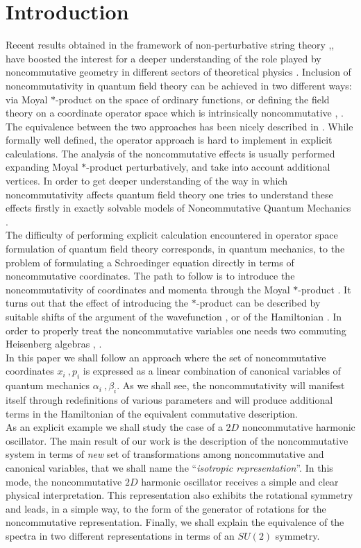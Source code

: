 \documentclass[a4paper,aps,prd,preprint]{revtex4}
\begin{document}
\section{Introduction}
Recent results obtained in the framework of non-perturbative string theory
\cite{witten},\cite{sw}, have boosted the interest for a deeper 
understanding of the role played by noncommutative geometry in different 
sectors of theoretical physics \cite{schw}. 
Inclusion of noncommutativity in quantum field theory 
can be achieved in two different ways: via Moyal $\ast$-product on the space of
ordinary functions, or defining the field
theory on a coordinate operator space which is intrinsically noncommutative
\cite{nekra}, \cite{presn}. The equivalence between the two approaches has been
nicely described in \cite{agw}. While formally well defined,
the operator approach is hard to implement  in explicit calculations. The
analysis of the noncommutative effects is usually performed expanding
Moyal $\ast$-product  perturbatively, and take into account additional vertices.
In order to get
deeper understanding of the way in which noncommutativity affects quantum
field theory one tries to understand these effects firstly in exactly solvable
models  of Noncommutative Quantum Mechanics \cite{qm}. \\
The difficulty of performing explicit calculation encountered in  operator
space formulation of quantum field theory corresponds, in quantum mechanics,
to the problem  of  formulating a Schroedinger equation directly in terms
of noncommutative coordinates. The path to follow is to introduce the
noncommutativity of coordinates and momenta
 through the Moyal $\ast$-product \cite{greci}. It turns out that the effect of
 introducing the  $\ast$-product can be described by suitable shifts 
 of the argument of the wavefunction \cite{gamb}, or of the Hamiltonian
 \cite{jell}. In order to properly treat the noncommutative variables
 one needs two  commuting Heisenberg algebras \cite{nair}, \cite{bellucci}. \\
In this paper we shall follow an approach where the set of 
noncommutative coordinates $x_i\ , p_i$ is expressed as a linear 
combination of canonical variables of quantum mechanics $\alpha_i\ , \beta_i$.
As we shall see, the noncommutativity will manifest itself through
redefinitions of various parameters and will produce additional 
terms in the Hamiltonian of the equivalent commutative description.\\
 As an explicit example we shall study
 the case of a $2D$ noncommutative harmonic oscillator.
The main result of our work is the description of the noncommutative system
in terms of {\it new} set of transformations among noncommutative and
canonical variables, that we shall name the 
 ``{\it isotropic  representation}''. In this mode, the noncommutative $2D$ 
 harmonic oscillator receives a simple and clear physical  interpretation. 
 This representation also exhibits  the rotational symmetry and leads, in 
 a simple way, to the  
 form of the generator of rotations for the noncommutative representation.
 Finally, we shall explain the equivalence of the spectra in  two different 
 representations in terms of an $SU(2)$ symmetry.\\
\end{document}

